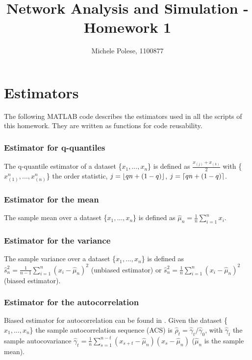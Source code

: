 \documentclass[10pt]{article}
\DeclarePairedDelimiter{\ceil}{\lceil}{\rceil}
\DeclarePairedDelimiter{\floor}{\lfloor}{\rfloor}
\begin{document}
\title{Network Analysis and Simulation - Homework 1}
\author{Michele Polese, 1100877}

\maketitle

\section{Estimators}
The following MATLAB code describes the estimators used in all the scripts of this homework. They are written as functions for code reusability.
\subsubsection*{Estimator for q-quantiles}
The q-quantile estimator of a dataset \{$x_1, ... , x_n$\} is defined as $\frac{x_{(j)}+x_{(k)}}{2}$ with \{$x_{(1)}^n, ... , x_{(n)}^n$\} the order statistic, $j = \floor{qn + (1 - q)}$, $j = \ceil{qn + (1 - q)}$.


\subsubsection*{Estimator for the mean}
The sample mean over a dataset \{$x_1, ... , x_n$\} is defined as $\hat{\mu}_n = \frac{1}{n}\sum_{i=1}^n x_i$.


\subsubsection*{Estimator for the variance}
The sample variance over a dataset \{$x_1, ... , x_n$\} is defined as $\hat{s}_n^2 = \frac{1}{n - 1}\sum_{i=1}^n (x_i - \hat{\mu}_n)^2$ (unbiased estimator) or $\hat{s}_n^2 = \frac{1}{n}\sum_{i=1}^n (x_i - \hat{\mu}_n)^2$ (biased estimator).


\subsubsection*{Estimator for the autocorrelation}
Biased estimator for autocorrelation can be found in \cite{leb}. Given the dataset \{$x_1, ... , x_n$\} the sample autocorrelation sequence (ACS) is $\hat{\rho}_t = \hat{\gamma}_t / \hat{\gamma}_0$, with $\hat{\gamma}_t$ the sample autocovariance $\hat{\gamma}_t = \frac{1}{n}\sum_{s=1}^{n-t} (x_{s + t} - \hat{\mu}_n)(x_{s} - \hat{\mu}_n)$ ($\hat{\mu}_n$ is the sample mean).

\end{document}

